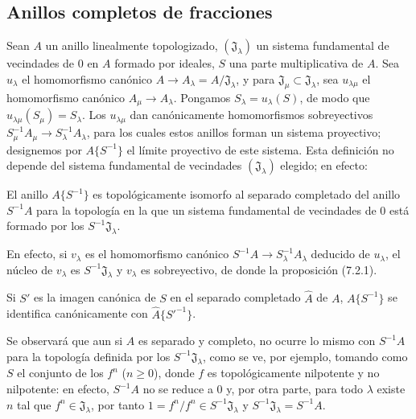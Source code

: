 \subsection{Anillos completos de fracciones}
\label{subsection:0.7.6-fr}

\begin{env}[7.6.1]
\label{0.7.6.1-fr}
Sean $A$ un anillo linealmente topologizado, $(\mathfrak J_\lambda)$ un
sistema fundamental de vecindades de 0 en $A$ formado por ideales, $S$ una parte
multiplicativa de $A$. Sea $u_\lambda$ el homomorfismo canónico
$A\to A_\lambda=A/\mathfrak J_\lambda$, y para
$\mathfrak J_\mu\subset\mathfrak J_\lambda$, sea $u_{\lambda\mu}$
el homomorfismo canónico $A_\mu\to A_\lambda$. Pongamos
$S_\lambda=u_\lambda(S)$, de modo que
$u_{\lambda\mu}(S_\mu)=S_\lambda$. Los $u_{\lambda\mu}$ dan
canónicamente homomorfismos sobreyectivos
$S_\mu^{-1}A_\mu\to S_\lambda^{-1}A_\lambda$, para los cuales estos anillos
forman un sistema proyectivo; designemos por $A\{S^{-1}\}$ el límite
proyectivo de este sistema. Esta definición no depende del sistema fundamental
de vecindades $(\mathfrak J_\lambda)$ elegido; en efecto:
\end{env}

\begin{proposition}[7.6.2]
\label{0.7.6.2-fr}
El anillo $A\{S^{-1}\}$ es topológicamente isomorfo al separado completado del
anillo $S^{-1}A$ para la topología en la que un sistema fundamental de vecindades
de 0 está formado por los $S^{-1}\mathfrak J_\lambda$.
\end{proposition}

En efecto, si $v_\lambda$ es el homomorfismo canónico
$S^{-1}A\to S_\lambda^{-1}A_\lambda$ deducido de $u_\lambda$, el núcleo de
$v_\lambda$ es $S^{-1}\mathfrak J_\lambda$ y $v_\lambda$ es sobreyectivo,
de donde la proposición (7.2.1).

\begin{corollary}[7.6.3]
\label{0.7.6.3-fr}
Si $S'$ es la imagen canónica de $S$ en el separado completado $\widehat A$ de
$A$, $A\{S^{-1}\}$ se identifica canónicamente con
$\widehat A\{{S'}^{-1}\}$.
\end{corollary}

Se observará que aun si $A$ es separado y completo, no ocurre lo mismo con
$S^{-1}A$ para la topología definida por los
$S^{-1}\mathfrak J_\lambda$, como se ve, por ejemplo, tomando como $S$
el conjunto de los $f^n$ ($n\geq0$), donde $f$ es topológicamente nilpotente y no
nilpotente: en efecto, $S^{-1}A$ no se reduce a 0 y, por otra parte, para todo
$\lambda$ existe $n$ tal que $f^n\in\mathfrak J_\lambda$, por tanto
$1=f^n/f^n\in S^{-1}\mathfrak J_\lambda$ y
$S^{-1}\mathfrak J_\lambda=S^{-1}A$.

